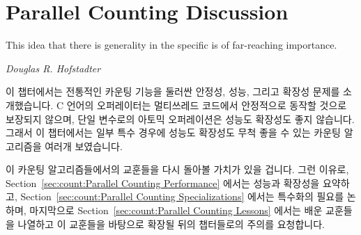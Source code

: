 \section{Parallel Counting Discussion}
\label{sec:count:Parallel Counting Discussion}
%
\epigraph{This idea that there is generality in the specific is of
	  far-reaching importance.}
	 {\emph{Douglas R. Hofstadter}}

이 챕터에서는 전통적인 카운팅 기능을 둘러싼 안정성, 성능, 그리고 확장성 문제를
소개했습니다.
C 언어의 \co{++}  오퍼레이터는 멀티쓰레드 코드에서 안정적으로 동작할 것으로
보장되지 않으며, 단일 변수로의 아토믹 오퍼레이션은 성능도 확장성도 좋지
않습니다.
그래서 이 챕터에서는 일부 특수 경우에 성능도 확장성도 무척 좋을 수 있는 카운팅
알고리즘을 여러개 보였습니다.

이 카운팅 알고리즘들에서의 교훈들을 다시 돌아볼 가치가 있을 겁니다.
그런 이유로,
Section~\ref{sec:count:Parallel Counting Performance}
에서는 성능과 확장성을 요약하고,
Section~\ref{sec:count:Parallel Counting Specializations}
에서는 특수화의 필요를 논하며, 마지막으로
Section~\ref{sec:count:Parallel Counting Lessons}
에서는 배운 교훈들을 나열하고 이 교훈들을 바탕으로 확장될 뒤의 챕터들로의
주의를 요청합니다.

